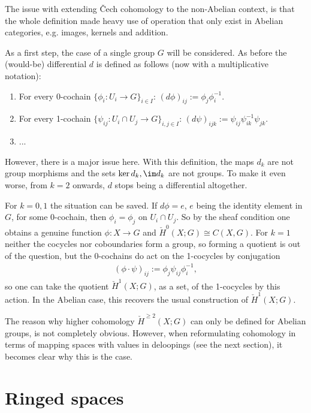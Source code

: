     The issue with extending \v{Cech} cohomology to the non-Abelian context, is that the whole definition made heavy use of operation that only exist in Abelian categories, e.g. images, kernels and addition.

    As a first step, the case of a single group $G$ will be considered. As before the (would-be) differential $d$ is defined as follows (now with a multiplicative notation):
    \begin{enumerate}
        \item For every 0-cochain $\{\phi_i:U_i\rightarrow G\}_{i\in I}$: $(d\phi)_{ij}:=\phi_j\phi^{-1}_i$.
        \item For every 1-cochain $\{\psi_{ij}:U_i\cap U_j\rightarrow G\}_{i,j\in I}$: $(d\psi)_{ijk} := \psi_{ij}\psi^{-1}_{ik}\psi_{jk}$.
        \item ...
    \end{enumerate}
    However, there is a major issue here. With this definition, the maps $d_k$ are not group morphisms and the sets $\ker d_k,\im d_k$ are not groups. To make it even worse, from $k=2$ onwards, $d$ stops being a differential altogether.

    For $k=0,1$ the situation can be saved. If $d\phi=e$, $e$ being the identity element in $G$, for some 0-cochain, then $\phi_i=\phi_j$ on $U_i\cap U_j$. So by the sheaf condition one obtains a genuine function $\phi:X\rightarrow G$ and $\check{H}^0(X;G)\cong C(X,G)$. For $k=1$ neither the cocycles nor coboundaries form a group, so forming a quotient is out of the question, but the 0-cochains do act on the 1-cocycles by conjugation
    \begin{gather}
        (\phi\cdot\psi)_{ij} := \phi_j\psi_{ij}\phi^{-1}_i,
    \end{gather}
    so one can take the quotient $\check{H}^1(X;G)$, as a set, of the 1-cocycles by this action. In the Abelian case, this recovers the usual construction of $\check{H}^1(X;G)$.

    \begin{remark*}
        The reason why higher cohomology $\check{H}^{\geq2}(X;G)$ can only be defined for Abelian groups, is not completely obvious. However, when reformulating cohomology in terms of mapping spaces with values in deloopings (see the next section), it becomes clear why this is the case.
    \end{remark*}

\section{Ringed spaces}

